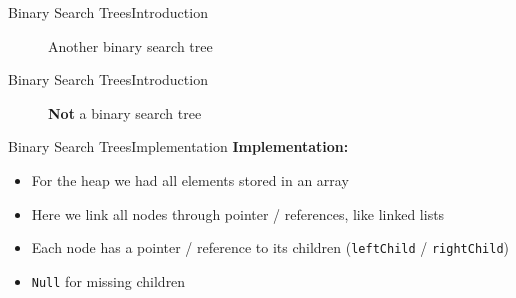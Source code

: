 
\begin{frame}{Binary Search Trees}{Introduction}
  \begin{figure}
    
    \caption{Another binary search tree}
    \label{fig:binary_search_trees:binary_tree_example2}
  \end{figure}
\end{frame}


\begin{frame}{Binary Search Trees}{Introduction}
  \begin{figure}
    
    \caption{\textbf{Not} a binary search tree}
    \label{fig:binary_search_trees:binary_tree_example3}
  \end{figure}
\end{frame}


\begin{frame}{Binary Search Trees}{Implementation}
  \textbf{Implementation:}
  \begin{itemize}
    \item<2->
      For the heap we had all elements stored in an array
    \item<2->
      Here we link all nodes through pointer / references, like linked lists
    \item<3->
      Each node has a pointer / reference to its children
      (\texttt{\color{Mittel-Blau}leftChild} /
      \texttt{\color{Mittel-Blau}rightChild})
    \item<4->
      \texttt{\color{Mittel-Blau}Null} for missing children
  \end{itemize}
  \vspace{-1.0em}
  \begin{figure}
    
    \label{fig:binary_search_trees:binary_tree_impl1}
  \end{figure}
\end{frame}


